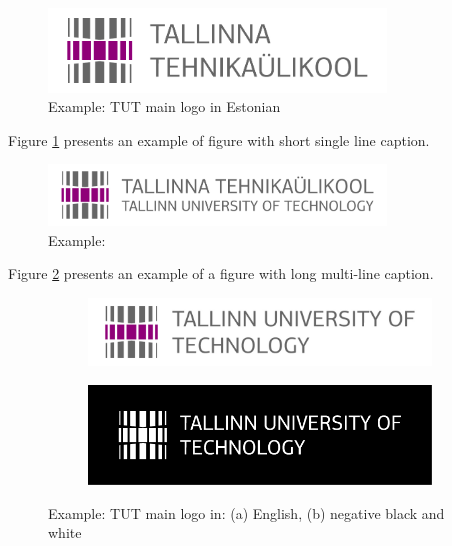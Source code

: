
\begin{figure}[!ht]
  \centering
  \includegraphics[width=0.8\textwidth]{figures/TTU_peamine_logo_EST_print}
  \caption{ Example: TUT main logo in Estonian}
  \label{fig:logo}
\end{figure}

Figure \ref{fig:logo} presents an example of figure with short single
line caption.

\begin{figure}[!ht]
  \centering
  \includegraphics[width=0.8\textwidth]{figures/TTU_alternatiivne_logo_EST_ENG_print}
  \caption{Example: \blindtext} %
  \label{fig:logo2}
\end{figure}

Figure \ref{fig:logo2} presents an example of a figure with long multi-line caption.


\begin{figure}[!ht]
  \centering
  \begin{subfigure}[b]{0.45\textwidth}
    \includegraphics[width=\textwidth]{figures/TTU_peamine_logo_ENG_print}
    \caption{}
  \end{subfigure}
  \qquad
  \begin{subfigure}[b]{0.45\textwidth}
    \includegraphics[width=\textwidth]{figures/ttu_peamine_logo_eng_must-valge_negatiivis}
    \caption{}
  \end{subfigure}
  \caption{Example: TUT main logo in: (a) English, (b) negative black and white}
  \label{fig:logo3}
\end{figure}

